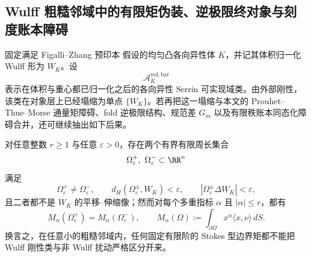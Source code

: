 \subsection{Wulff 粗糙邻域中的有限矩伪装、逆极限终对象与刻度账本障碍}\label{subsec:conclusion-anisotropic-serrin-wulff-camouflage-terminal-ledger}
固定满足 Figalli--Zhang 预印本 \cite{FigalliZhang2026AnisotropicSerrinGeneralDomains} 假设的均匀凸各向异性体 \(K\)，并记其体积归一化 Wulff 形为 \(W_K\)。设
\[
\mathcal A_K^{\mathrm{vol,bar}}
\]
表示在体积与重心都已归一化之后的各向异性 Serrin 可实现域类。由外部刚性，该类在对象层上已经塌缩为单点 \(\{W_K\}\)。若再把这一塌缩与本文的 Prouhet--Thue--Morse 通量矩障碍、fold 逆极限结构、规范差 \(G_m\) 以及有限秩账本同态化障碍合并，还可继续抽出如下后果。

\begin{theorem}\label{thm:conclusion-serrin-wulff-finite-order-boundary-moment-camouflage}
对任意整数 \(r\ge 1\) 与任意 \(\varepsilon>0\)，存在两个有界有限周长集合
\[
\Omega_\varepsilon^+,\ \Omega_\varepsilon^- \subset \RR^n
\]
满足
\[
\Omega_\varepsilon^+\neq \Omega_\varepsilon^-,
\qquad
d_H(\Omega_\varepsilon^\pm,W_K)<\varepsilon,
\qquad
|\Omega_\varepsilon^\pm\Delta W_K|<\varepsilon,
\]
且二者都不是 \(W_K\) 的平移--伸缩像；然而对每个多重指标 \(\alpha\) 且 \(|\alpha|\le r\)，都有
\[
M_\alpha(\Omega_\varepsilon^+)
=
M_\alpha(\Omega_\varepsilon^-),
\qquad
M_\alpha(\Omega):=\int_{\partial\Omega}x^\alpha\langle x,\nu\rangle\,dS.
\]
换言之，在任意小的粗糙邻域内，任何固定有限阶的 Stokes 型边界矩都不能把 Wulff 刚性类与非 Wulff 扰动严格区分开来。
\end{theorem}
